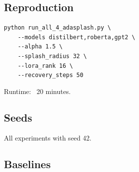 \subsection{Reproduction}

\begin{lstlisting}
python run_all_4_adasplash.py \
    --models distilbert,roberta,gpt2 \
    --alpha 1.5 \
    --splash_radius 32 \
    --lora_rank 16 \
    --recovery_steps 50
\end{lstlisting}

Runtime: ~20 minutes.

\subsection{Seeds}

All experiments with seed 42.

\subsection{Baselines}
